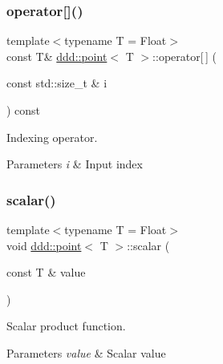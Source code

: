\subsubsection{\texorpdfstring{operator[]()}{operator[]()}\hspace{0.1cm}{\footnotesize\ttfamily [2/2]}}
{\footnotesize\ttfamily template$<$typename T = Float$>$ \\
const T\& \hyperlink{classddd_1_1point}{ddd\+::point}$<$ T $>$\+::operator\mbox{[}$\,$\mbox{]} (\begin{DoxyParamCaption}\item[{const std\+::size\+\_\+t \&}]{i }\end{DoxyParamCaption}) const\hspace{0.3cm}{\ttfamily [inline]}}



Indexing operator. 


\begin{DoxyParams}{Parameters}
{\em i} & Input index \\
\hline
\end{DoxyParams}
\mbox{\label{classddd_1_1point_ac913d28476f33d1cc300d281d625e0f3}} 
\subsubsection{\texorpdfstring{scalar()}{scalar()}}
{\footnotesize\ttfamily template$<$typename T = Float$>$ \\
void \hyperlink{classddd_1_1point}{ddd\+::point}$<$ T $>$\+::scalar (\begin{DoxyParamCaption}\item[{const T \&}]{value }\end{DoxyParamCaption})\hspace{0.3cm}{\ttfamily [inline]}}



Scalar product function. 


\begin{DoxyParams}{Parameters}
{\em value} & Scalar value \\
\hline
\end{DoxyParams}
\mbox{\label{classddd_1_1point_abf2e2ea5474534eb17d1cb6bd96b7913}} 
